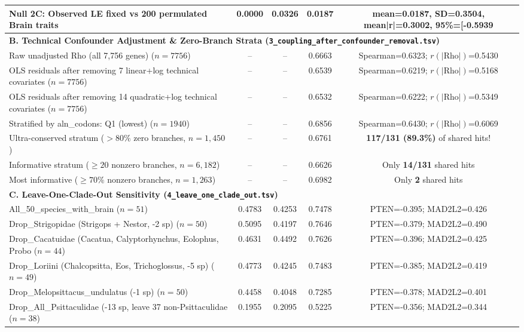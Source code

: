 \documentclass[9pt,a4paper]{article}
\begin{document}
\begin{longtable}{p{6.5cm}cccc}
Null 2C: Observed LE fixed vs 200 permulated Brain traits & 0.0000 & 0.0326 & 0.0187 & \scriptsize mean=0.0187, SD=0.3504, mean|r|=0.3002, 95\%=[-0.5939 \\
\midrule\multicolumn{5}{l}{\textbf{B. Technical Confounder Adjustment \& Zero-Branch Strata (\texttt{3\_coupling\_after\_confounder\_removal.tsv})}} \\
Raw unadjusted Rho (all 7,756 genes) ($n=7756$) & -- & -- & 0.6663 & Spearman=0.6323; $r(|\text{Rho}|)$=0.5430 \\
OLS residuals after removing 7 linear+log technical covariates ($n=7756$) & -- & -- & 0.6539 & Spearman=0.6219; $r(|\text{Rho}|)$=0.5168 \\
OLS residuals after removing 14 quadratic+log technical covariates ($n=7756$) & -- & -- & 0.6532 & Spearman=0.6222; $r(|\text{Rho}|)$=0.5349 \\
Stratified by aln\_codons: Q1 (lowest) ($n=1940$) & -- & -- & 0.6856 & Spearman=0.6430; $r(|\text{Rho}|)$=0.6069 \\
Ultra-conserved stratum ($>80\%$ zero branches, $n=1,450$) & -- & -- & 0.6761 & \textbf{117/131 (89.3\%)} of shared hits! \\
Informative stratum ($\ge 20$ nonzero branches, $n=6,182$) & -- & -- & 0.6626 & Only \textbf{14/131} shared hits \\
Most informative ($\ge 70\%$ nonzero branches, $n=1,263$) & -- & -- & 0.6982 & Only \textbf{2} shared hits \\
\midrule\multicolumn{5}{l}{\textbf{C. Leave-One-Clade-Out Sensitivity (\texttt{4\_leave\_one\_clade\_out.tsv})}} \\
All\_50\_species\_with\_brain ($n=51$) & 0.4783 & 0.4253 & 0.7478 & PTEN=-0.395; MAD2L2=0.426 \\
Drop\_Strigopidae (Strigops + Nestor, -2 sp) ($n=50$) & 0.5095 & 0.4197 & 0.7646 & PTEN=-0.379; MAD2L2=0.490 \\
Drop\_Cacatuidae (Cacatua, Calyptorhynchus, Eolophus, Probo ($n=44$) & 0.4631 & 0.4492 & 0.7626 & PTEN=-0.396; MAD2L2=0.425 \\
Drop\_Loriini (Chalcopsitta, Eos, Trichoglossus, -5 sp) ($n=49$) & 0.4773 & 0.4245 & 0.7483 & PTEN=-0.385; MAD2L2=0.419 \\
Drop\_Melopsittacus\_undulatus (-1 sp) ($n=50$) & 0.4458 & 0.4048 & 0.7285 & PTEN=-0.378; MAD2L2=0.401 \\
Drop\_All\_Psittaculidae (-13 sp, leave 37 non-Psittaculidae ($n=38$) & 0.1955 & 0.2095 & 0.5225 & PTEN=-0.356; MAD2L2=0.344 \\

\end{longtable}
\end{document}
